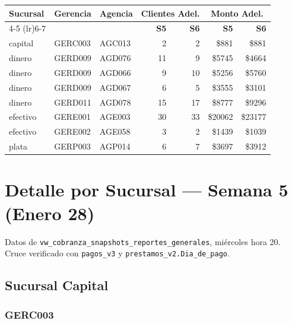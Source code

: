 \documentclass[11pt,a4paper]{article}
\newcommand{\money}[1]{\$\num{#1}}
\begin{document}
\begin{center}
\renewcommand{\arraystretch}{1.3}
\begin{tabular}{lllrrrr}
\toprule
\textbf{Sucursal} & \textbf{Gerencia} & \textbf{Agencia}
  & \multicolumn{2}{c}{\textbf{Clientes Adel.}}
  & \multicolumn{2}{c}{\textbf{Monto Adel.}} \\
\cmidrule(lr){4-5} \cmidrule(lr){6-7}
& & & \textbf{S5} & \textbf{S6} & \textbf{S5} & \textbf{S6} \\
\midrule
capital  & GERC003 & AGC013 & 2  & 2  & \money{881}   & \money{881} \\
dinero   & GERD009 & AGD076 & 11 & 9  & \money{5745}  & \money{4664} \\
dinero   & GERD009 & AGD066 & 9  & 10 & \money{5256}  & \money{5760} \\
dinero   & GERD009 & AGD067 & 6  & 5  & \money{3555}  & \money{3101} \\
dinero   & GERD011 & AGD078 & 15 & 17 & \money{8777}  & \money{9296} \\
efectivo & GERE001 & AGE003 & 30 & 33 & \money{20062} & \money{23177} \\
efectivo & GERE002 & AGE058 & 3  & 2  & \money{1439}  & \money{1039} \\
plata    & GERP003 & AGP014 & 6  & 7  & \money{3697}  & \money{3912} \\
\bottomrule
\end{tabular}
\end{center}

\section{Detalle por Sucursal --- Semana 5 (Enero 28)}

Datos de \texttt{vw\_cobranza\_snapshots\_reportes\_generales}, mi\'ercoles hora 20.
Cruce verificado con \texttt{pagos\_v3} y \texttt{prestamos\_v2.Dia\_de\_pago}.

\subsection{Sucursal Capital}

\subsubsection{GERC003}
\end{document}

